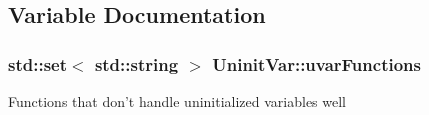 \subsection{Variable Documentation}
\hypertarget{group___checks_ga253dcf06ccb9bd907ea83454d47a8e8c}{
\subsubsection[{uvar\-Functions}]{\setlength{\rightskip}{0pt plus 5cm}std\-::set$<$ std\-::string $>$ Uninit\-Var\-::uvar\-Functions\hspace{0.3cm}{\ttfamily [static]}}}\label{group___checks_ga253dcf06ccb9bd907ea83454d47a8e8c}
Functions that don't handle uninitialized variables well 